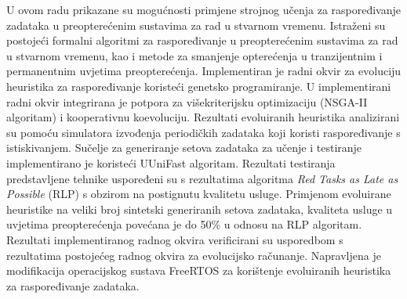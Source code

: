 \documentclass[utf8, diplomski, english, numeric]{fer}
\begin{document}
\newpage
\begin{sazetak}
U ovom radu prikazane su mogućnosti primjene strojnog učenja za raspoređivanje zadataka u preopterećenim sustavima za rad u stvarnom vremenu.
Istraženi su postojeći formalni algoritmi za raspoređivanje u preopterećenim sustavima za rad u stvarnom vremenu, kao i metode za smanjenje opterećenja u tranzijentnim i permanentnim uvjetima preopterećenja.
Implementiran je radni okvir za evoluciju heuristika za raspoređivanje koristeći genetsko programiranje.
U implementirani radni okvir integrirana je potpora za višekriterijsku optimizaciju (NSGA-II algoritam) i kooperativnu koevoluciju.
Rezultati evoluiranih heuristika analizirani su pomoću simulatora izvođenja periodičkih zadataka koji koristi raspoređivanje s istiskivanjem.
Sučelje za generiranje setova zadataka za učenje i testiranje implementirano je koristeći UUniFast algoritam.
Rezultati testiranja predstavljene tehnike uspoređeni su s rezultatima algoritma \textit{Red Tasks as Late as Possible} (RLP) s obzirom na postignutu kvalitetu usluge.
Primjenom evoluirane heuristike na veliki broj sintetski generiranih setova zadataka,
kvaliteta usluge u uvjetima preopterećenja povećana je do 50\% u odnosu na RLP algoritam.
Rezultati implementiranog radnog okvira verificirani su usporedbom s rezultatima postojećeg radnog okvira za evolucijsko računanje.
Napravljena je modifikacija operacijskog sustava FreeRTOS za korištenje evoluiranih heuristika za raspoređivanje zadataka.

\end{sazetak}
\end{document}
